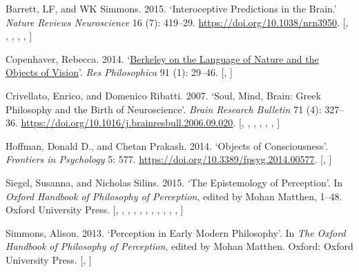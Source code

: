\documentclass[
  12pt,
  a4paper,
  oneside,
  titlepage,
  toclink=all,
  toc=bibliography]{scrbook}
\newlength{\cslhangindent}
\newlength{\cslentryspacingunit} %
\newenvironment{CSLReferences}[2] %
 {%
  \setlength{\parindent}{0pt}
  \ifodd #1
  \let\oldpar\par
  \def\par{\hangindent=\cslhangindent\oldpar}
  \fi
  \setlength{\parskip}{#2\cslentryspacingunit}
 }%
 {}
\theoremstyle{plain}
\theoremstyle{plain}
\theoremstyle{definition}
\theoremstyle{definition}
\theoremstyle{plain}
\theoremstyle{plain}
\theoremstyle{plain}
\theoremstyle{definition}
\theoremstyle{remark}
\begin{document}
\hypertarget{refs_scriv208}{}
\begin{CSLReferences}{1}{0}
\leavevmode{}%
Barrett, LF, and WK Simmons. 2015. {`Interoceptive Predictions in the
Brain.'} \emph{Nature Reviews Neuroscience} 16 (7): 419--29.
\url{https://doi.org/10.1038/nrn3950}.
{[},
\protect\hyperlink{cite_2}{\pageref{cite_2}},
\protect\hyperlink{cite_7}{\pageref{cite_7}},
\protect\hyperlink{cite_8}{\pageref{cite_8}},
\protect\hyperlink{cite_9}{\pageref{cite_9}},
\protect\hyperlink{cite_37}{\pageref{cite_37}}{]}

\leavevmode{}%
Copenhaver, Rebecca. 2014. {`\href{}{Berkeley on the Language of Nature
and the Objects of Vision}'}. \emph{Res Philosophica} 91 (1): 29--46.
{[},
\protect\hyperlink{cite_7}{\pageref{cite_7}}{]}

\leavevmode{}%
Crivellato, Enrico, and Domenico Ribatti. 2007. {`Soul, Mind, Brain:
Greek Philosophy and the Birth of Neuroscience'}. \emph{Brain Research
Bulletin} 71 (4): 327--36.
\url{https://doi.org/10.1016/j.brainresbull.2006.09.020}.
{[},
\protect\hyperlink{cite_1}{\pageref{cite_1}},
\protect\hyperlink{cite_2}{\pageref{cite_2}},
\protect\hyperlink{cite_5}{\pageref{cite_5}},
\protect\hyperlink{cite_9}{\pageref{cite_9}},
\protect\hyperlink{cite_27}{\pageref{cite_27}},
\protect\hyperlink{cite_37}{\pageref{cite_37}}{]}

\leavevmode{}%
Hoffman, Donald D., and Chetan Prakash. 2014. {`Objects of
Consciousness'}. \emph{Frontiers in Psychology} 5: 577.
\url{https://doi.org/10.3389/fpsyg.2014.00577}.
{[},
\protect\hyperlink{cite_7}{\pageref{cite_7}}{]}

\leavevmode{}%
Siegel, Susanna, and Nicholas Silins. 2015. {`The Epistemology of
Perception'}. In \emph{Oxford Handbook of Philosophy of Perception},
edited by Mohan Matthen, 1--48. Oxford University Press.
{[},
\protect\hyperlink{cite_7}{\pageref{cite_7}},
\protect\hyperlink{cite_14}{\pageref{cite_14}},
\protect\hyperlink{cite_15}{\pageref{cite_15}},
\protect\hyperlink{cite_19}{\pageref{cite_19}},
\protect\hyperlink{cite_22}{\pageref{cite_22}},
\protect\hyperlink{cite_28}{\pageref{cite_28}},
\protect\hyperlink{cite_33}{\pageref{cite_33}},
\protect\hyperlink{cite_34}{\pageref{cite_34}},
\protect\hyperlink{cite_35}{\pageref{cite_35}},
\protect\hyperlink{cite_36}{\pageref{cite_36}},
\protect\hyperlink{cite_37}{\pageref{cite_37}}{]}

\leavevmode{}%
Simmons, Alison. 2013. {`Perception in Early Modern Philosophy'}. In
\emph{The Oxford Handbook of Philosophy of Perception}, edited by Mohan
Matthen. Oxford: Oxford University Press.
{[},
\protect\hyperlink{cite_7}{\pageref{cite_7}}{]}

\end{CSLReferences}


\backmatter
\end{document}
